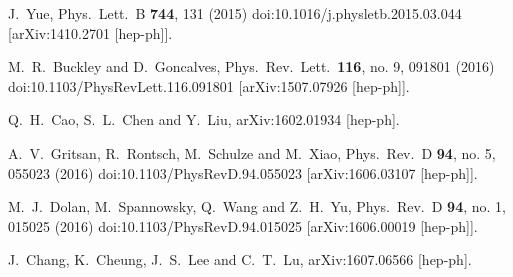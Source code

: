 \documentclass[twocolumn,prd,noshowpacs,nofootinbib,amsmath,amssymb,superscriptaddress,preprintnumbers]{revtex4}
\begin{document}
\begin{thebibliography}{99}
  J.~Yue,
  Phys.\ Lett.\ B {\bf 744}, 131 (2015)
  doi:10.1016/j.physletb.2015.03.044
  [arXiv:1410.2701 [hep-ph]].


  M.~R.~Buckley and D.~Goncalves,
  Phys.\ Rev.\ Lett.\  {\bf 116}, no. 9, 091801 (2016)
  doi:10.1103/PhysRevLett.116.091801
  [arXiv:1507.07926 [hep-ph]].




  Q.~H.~Cao, S.~L.~Chen and Y.~Liu,
  arXiv:1602.01934 [hep-ph].




  A.~V.~Gritsan, R.~Rontsch, M.~Schulze and M.~Xiao,
  Phys.\ Rev.\ D {\bf 94}, no. 5, 055023 (2016)
  doi:10.1103/PhysRevD.94.055023
  [arXiv:1606.03107 [hep-ph]].



  M.~J.~Dolan, M.~Spannowsky, Q.~Wang and Z.~H.~Yu,
  Phys.\ Rev.\ D {\bf 94}, no. 1, 015025 (2016)
  doi:10.1103/PhysRevD.94.015025
  [arXiv:1606.00019 [hep-ph]].



  J.~Chang, K.~Cheung, J.~S.~Lee and C.~T.~Lu,
  arXiv:1607.06566 [hep-ph].



\end{thebibliography}
\end{document}
